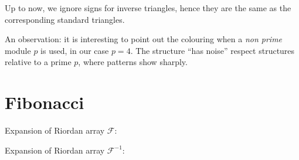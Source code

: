 \documentclass[10pt,a4paper]{article} %
\begin{document}
    Up to now, we ignore signs for inverse triangles, hence they are the same as the corresponding standard triangles.

    An observation: it is interesting to point out the colouring when a \emph{non prime} module $p$ is used, in
    our case $p=4$. The structure ``has noise'' respect structures relative to a prime $p$, where patterns
    show sharply.


    
    
    
    


    \section{Fibonacci}

    Expansion of Riordan array $\mathcal{F}$:
    
    Expansion of Riordan array $\mathcal{F}^{-1}$:
    

    
    

    
    
\end{document}
